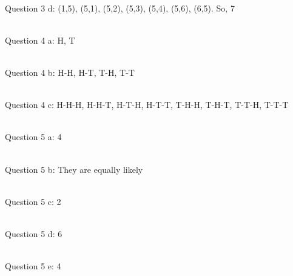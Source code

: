 {    ~\\ Question 3 d:   (1,5), (5,1), (5,2), (5,3), (5,4), (5,6), (6,5).
                        So, 7

    ~\\ Question 4 a:   H, T
    
    ~\\ Question 4 b:   H-H, H-T, T-H, T-T
    
    ~\\ Question 4 c:   H-H-H, H-H-T, H-T-H, H-T-T, T-H-H, T-H-T, T-T-H, T-T-T

    ~\\ Question 5 a:   4
    
    ~\\ Question 5 b:   They are equally likely
    
    ~\\ Question 5 c:   2
    
    ~\\ Question 5 d:   6
    
    ~\\ Question 5 e:   4
}

    


